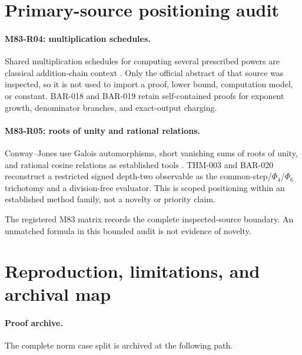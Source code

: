 \documentclass[11pt]{article}
\begin{document}
\appendix

\section{Primary-source positioning audit}
\label{app:cyclotomic-source-positioning}

\paragraph{M83-R04: multiplication schedules.}
Shared multiplication schedules for computing several prescribed powers are
classical addition-chain context \cite{yao1976evaluation}. Only the official
abstract of that source was inspected, so it is not used to import a proof,
lower bound, computation model, or constant. BAR-018 and BAR-019 retain
self-contained proofs for exponent growth, denominator branches, and
exact-output charging.

\paragraph{M83-R05: roots of unity and rational relations.}
Conway--Jones use Galois automorphisms, short vanishing sums of roots of
unity, and rational cosine relations as established tools
\cite{conway1976trigonometric}. THM-003 and BAR-020 reconstruct a restricted
signed depth-two observable as the common-step/\(\Phi_4\)/\(\Phi_6\)
trichotomy and a division-free evaluator. This is scoped positioning within
an established method family, not a novelty or priority claim.

The registered M83 matrix records the complete inspected-source boundary.
An unmatched formula in this bounded audit is not evidence of novelty.

\section{Reproduction, limitations, and archival map}
\label{app:cyclotomic-reproduction}

\paragraph{Proof archive.}
The complete norm case split is archived at the following path.
\par\smallskip
\noindent\begin{minipage}{\linewidth}
\raggedright\small
{}
\end{minipage}
\end{document}

